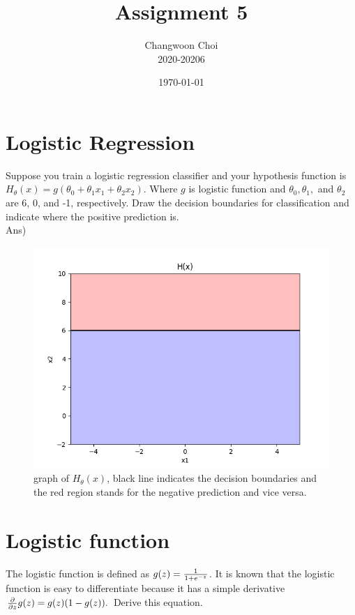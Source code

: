 \documentclass[12pt]{article}%
\begin{document}
\title{Assignment 5}
\author{Changwoon Choi \\ 2020-20206}
\date{\today}
\maketitle

\section{Logistic Regression}
Suppose you train a logistic regression classifier and your hypothesis function is $H_\theta (x) = g(\theta_0 + \theta_1 x_1 + \theta_2 x_2 ).$ Where $g$ is logistic function and $\theta_0 , \theta_1 ,$ and $\theta_2$ are 6, 0, and -1, respectively. Draw the decision boundaries for classification and indicate where the positive prediction is.
\\

Ans) \\
\begin{figure}[h]
	\centering
	\includegraphics[scale=0.5]{problem_1}
	\caption{graph of $H_\theta (x)$, black line indicates the decision boundaries and the red region stands for the negative prediction and vice versa.}
\end{figure}


\section{Logistic function}
The logistic function is defined as $g(z) = {1 \over 1 + e^{-z}}$. It is known that the logistic function is easy to differentiate because it has a simple derivative $ {\partial \over \partial z}g(z) = g(z)(1 - g(z)).$ Derive this equation.\\
\end{document}
